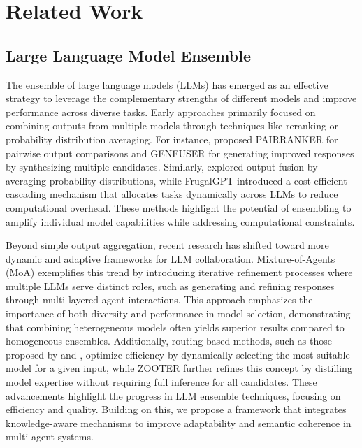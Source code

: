 \section{Related Work}
\subsection{Large Language Model Ensemble}

The ensemble of large language models (LLMs) has emerged as an effective strategy to leverage the complementary strengths of different models and improve performance across diverse tasks. Early approaches primarily focused on combining outputs from multiple models through techniques like reranking or probability distribution averaging. For instance, \citet{jiang2023llm} proposed PAIRRANKER for pairwise output comparisons and GENFUSER for generating improved responses by synthesizing multiple candidates. Similarly, \citet{DBLP:journals/corr/abs-2404-12715} explored output fusion by averaging probability distributions, while FrugalGPT \cite{chen2023frugalgpt} introduced a cost-efficient cascading mechanism that allocates tasks dynamically across LLMs to reduce computational overhead. These methods highlight the potential of ensembling to amplify individual model capabilities while addressing computational constraints.

Beyond simple output aggregation, recent research has shifted toward more dynamic and adaptive frameworks for LLM collaboration. Mixture-of-Agents (MoA) \citet{wang2024mixture} exemplifies this trend by introducing iterative refinement processes where multiple LLMs serve distinct roles, such as generating and refining responses through multi-layered agent interactions. This approach emphasizes the importance of both diversity and performance in model selection, demonstrating that combining heterogeneous models often yields superior results compared to homogeneous ensembles. Additionally, routing-based methods, such as those proposed by \citet{wang2023fusing} and \citet{shnitzer2023large}, optimize efficiency by dynamically selecting the most suitable model for a given input, while ZOOTER \cite{lu2023routing} further refines this concept by distilling model expertise without requiring full inference for all candidates. These advancements highlight the progress in LLM ensemble techniques, focusing on efficiency and quality. Building on this, we propose a framework that integrates knowledge-aware mechanisms to improve adaptability and semantic coherence in multi-agent systems.

